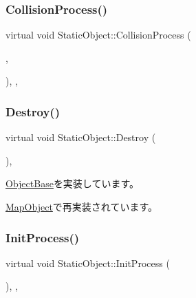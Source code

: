 \subsubsection{\texorpdfstring{Collision\+Process()}{CollisionProcess()}}
{\footnotesize\ttfamily virtual void Static\+Object\+::\+Collision\+Process (\begin{DoxyParamCaption}\item[{\mbox{\hyperlink{class_object_base}{Object\+Base}} $\ast$}]{,  }\item[{\mbox{\hyperlink{common_8h_afb0c5e21d4133ff4f200992c0b534e1b}{V\+E\+C2}}}]{ }\end{DoxyParamCaption})\hspace{0.3cm}{\ttfamily [inline]}, {\ttfamily [protected]}, {\ttfamily [virtual]}}

\mbox{\label{class_static_object_a8e9fb321b4f8f12c4bec1bc66853512f}} 
\subsubsection{\texorpdfstring{Destroy()}{Destroy()}}
{\footnotesize\ttfamily virtual void Static\+Object\+::\+Destroy (\begin{DoxyParamCaption}{ }\end{DoxyParamCaption})\hspace{0.3cm}{\ttfamily [inline]}, {\ttfamily [virtual]}}



\mbox{\hyperlink{class_object_base_a7fa4c548153c3af20f89673ffea809af}{Object\+Base}}を実装しています。



\mbox{\hyperlink{class_map_object_ad4bcfdc33bd945a9aa5e50a57c2704bc}{Map\+Object}}で再実装されています。

\mbox{\label{class_static_object_afa0709f50495338a23c1140062a567af}} 
\subsubsection{\texorpdfstring{Init\+Process()}{InitProcess()}}
{\footnotesize\ttfamily virtual void Static\+Object\+::\+Init\+Process (\begin{DoxyParamCaption}{ }\end{DoxyParamCaption})\hspace{0.3cm}{\ttfamily [inline]}, {\ttfamily [protected]}, {\ttfamily [virtual]}}



